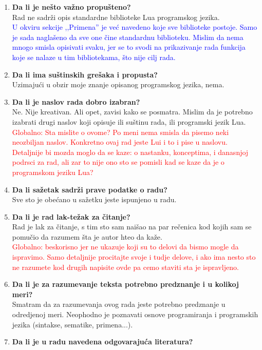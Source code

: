 \documentclass[a4paper]{report}
\newcommand{\odgovorAutora}[1]{\textcolor{blue}{#1}}
\newcommand{\note}[1]{\textcolor{red}{#1}}
\begin{document}
\begin{enumerate}
\item \textbf {Da li je nešto važno propušteno?}\\
  Rad ne sadr\v zi opis standardne biblioteke Lua programskog jezika. \\ 
  \odgovorAutora{U okviru sekcije ,,Primena'' je već navedeno koje sve biblioteke postoje. Samo je sada naglašeno da sve one čine standardnu biblioteku. Mislim da nema mnogo smisla opisivati svaku, jer se to svodi na prikazivanje rada funkcija koje se nalaze u tim bibliotekama, što nije cilj rada.}
\item \textbf {Da li ima suštinskih grešaka i propusta?}\\
  Uzimaju\' ci u obzir moje znanje opisanog programskog jezika, nema.
\item \textbf {Da li je naslov rada dobro izabran?}\\
  Ne. Nije kreativan. Ali opet, zavisi kako se posmatra. Mislim da je potrebno izabrati drugi naslov koji opisuje ili su\v stinu rada, ili programski jezik Lua. \\ \note{Globalno: Sta mislite o ovome? Po meni nema smisla da pisemo neki neozbiljan naslov. Konkretno ovaj rad jeste  Lui i to i pise u naslovu. Detaljnije bi mozda moglo da se kaze: o nastanku, konceptima, i danasnjoj podrsci za rad, ali zar to nije ono sto se pomisli kad se kaze da je o programskom jeziku Lua?}
\item \textbf {Da li sažetak sadrži prave podatke o radu?}\\
  Sve sto je obe\' cano u sa\v zetku jeste ispunjeno u radu.
\item \textbf {Da li je rad lak-težak za čitanje?}\\
  Rad je lak za \v citanje, s tim sto sam nai\v sao na par re\v cenica kod kojih sam se pomu\v cio da razumem \v sta je autor hteo da ka\v ze. \\ \note{Globalno: beskorisno jer ne ukazuje koji su to delovi da bismo mogle da ispravimo. Samo detaljnije procitajte svoje i tudje delove, i ako ima nesto sto ne razumete kod drugih napisite ovde pa cemo staviti sta je ispravljeno.}
\item \textbf {Da li je za razumevanje teksta potrebno predznanje i u kolikoj meri?}\\
  Smatram da za razumevanja ovog rada jeste potrebno predznanje u odredjenoj meri. Neophodno je poznavati osnove programiranja i programskih jezika (sintakse, sematike, primena...).
\item \textbf {Da li je u radu navedena odgovarajuća literatura?}\\

\end{enumerate}
\end{document}
